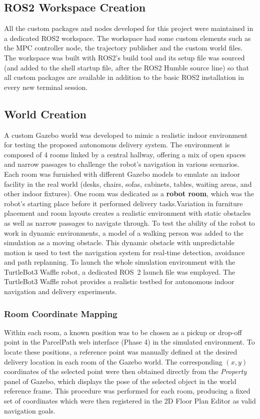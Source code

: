  \subsection{ROS2 Workspace Creation} \label{subsec:ros2_workspace} All the custom packages and nodes developed for this project were maintained in a dedicated ROS2 workspace. The workspace had some custom elements such as the MPC controller node, the trajectory publisher and the custom world files. The workspace was built with ROS2’s build tool and its setup file was sourced (and added to the shell startup file, after the ROS2 Humble source line) so that all custom packages are available in addition to the basic ROS2 installation in every new terminal session.
 \subsection{World Creation} \label{subsec:gazebo_world_creation} A custom Gazebo world was developed to mimic a realistic indoor environment for testing the proposed autonomous delivery system. The environment is composed of 4 rooms linked by a central hallway, offering a mix of open spaces and narrow passages to challenge the robot’s navigation in various scenarios. Each room was furnished with different Gazebo models to emulate an indoor facility in the real world (desks, chairs, sofas, cabinets, tables, waiting areas, and other indoor fixtures). One room was dedicated as a \textbf{robot room}, which was the robot's starting place before it performed delivery tasks.Variation in furniture placement and room layouts creates a realistic environment with static obstacles as well as narrow passages to navigate through. To test the ability of the robot to work in dynamic environments, a model of a walking person was added to the simulation as a moving obstacle. This dynamic obstacle with unpredictable motion is used to test the navigation system for real-time detection, avoidance and path replanning. To launch the whole simulation environment with the TurtleBot3 Waffle robot, a dedicated ROS~2 launch file was employed. The TurtleBot3 Waffle robot provides a realistic testbed for autonomous indoor navigation and delivery experiments.

\subsubsection*{Room Coordinate Mapping}

Within each room, a known position was to be chosen as a pickup or drop-off point in the ParcelPath web interface (Phase 4) in the simulated environment. To locate these positions, a reference point was manually defined at the desired delivery location in each room of the Gazebo world. The corresponding $(x,y)$ coordinates of the selected point were then obtained directly from the \textit{Property} panel of Gazebo, which displays the pose of the selected object in the world reference frame. This procedure was performed for each room, producing a fixed set of coordinates which were then registered in the 2D Floor Plan Editor as valid navigation goals.

